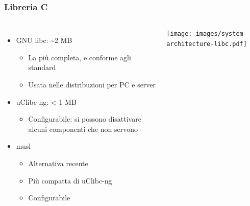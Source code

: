 \documentclass[xetex,table]{beamer}
\begin{document}
\begin{frame}
\frametitle{Libreria C}
  \begin{columns}
    \begin{itemize}
      \item GNU libc: \textasciitilde 2 MB
      \begin{itemize}
        \item La più completa, e conforme agli standard
        \item Usata nelle distribuzioni per PC e server
      \end{itemize}
      \item uClibc-ng: < 1 MB
      \begin{itemize}
        \item Configurabile: si possono disattivare alcuni componenti
          che non servono
      \end{itemize}
      \item musl
      \begin{itemize}
        \item Alternativa recente
        \item Più compatta di uClibc-ng
        \item Configurabile
      \end{itemize}
    \end{itemize}
    \texttt{[image: images/system-architecture-libc.pdf]}
  \end{columns}
\end{frame}
\end{document}
